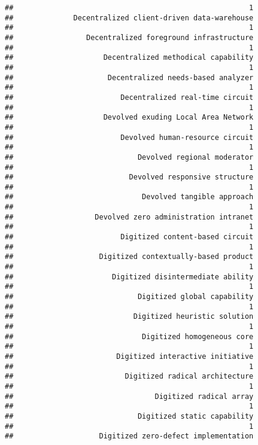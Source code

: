 \documentclass[
]{article}
\begin{document}
\begin{verbatim}
##                                                       1 
##              Decentralized client-driven data-warehouse 
##                                                       1 
##                 Decentralized foreground infrastructure 
##                                                       1 
##                     Decentralized methodical capability 
##                                                       1 
##                      Decentralized needs-based analyzer 
##                                                       1 
##                         Decentralized real-time circuit 
##                                                       1 
##                     Devolved exuding Local Area Network 
##                                                       1 
##                         Devolved human-resource circuit 
##                                                       1 
##                             Devolved regional moderator 
##                                                       1 
##                           Devolved responsive structure 
##                                                       1 
##                              Devolved tangible approach 
##                                                       1 
##                   Devolved zero administration intranet 
##                                                       1 
##                         Digitized content-based circuit 
##                                                       1 
##                    Digitized contextually-based product 
##                                                       1 
##                       Digitized disintermediate ability 
##                                                       1 
##                             Digitized global capability 
##                                                       1 
##                            Digitized heuristic solution 
##                                                       1 
##                              Digitized homogeneous core 
##                                                       1 
##                        Digitized interactive initiative 
##                                                       1 
##                          Digitized radical architecture 
##                                                       1 
##                                 Digitized radical array 
##                                                       1 
##                             Digitized static capability 
##                                                       1 
##                    Digitized zero-defect implementation 

\end{verbatim}
\end{document}
